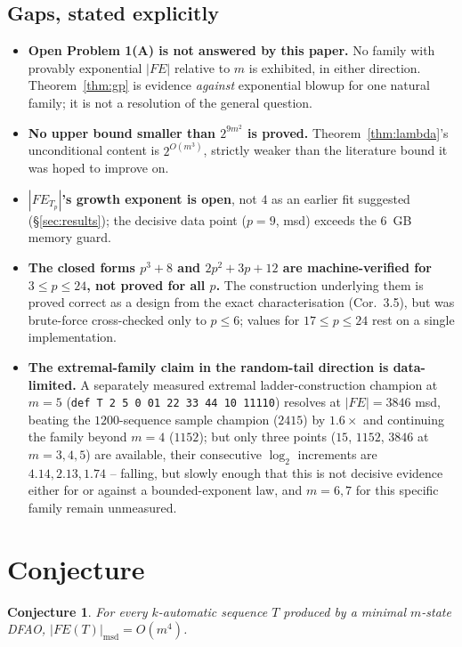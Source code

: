 \documentclass[11pt]{article}
\newtheorem{conjecture}[theorem]{Conjecture}
\begin{document}
\subsection{Gaps, stated explicitly}

\begin{itemize}
\item \textbf{Open Problem 1(A) is not answered by this paper.} No family with
provably exponential $|FE|$ relative to $m$ is exhibited, in either direction. Theorem~\ref{thm:gp}
is evidence \emph{against} exponential blowup for one natural family; it is not a
resolution of the general question.
\item \textbf{No upper bound smaller than $2^{9m^2}$ is proved.} Theorem~\ref{thm:lambda}'s
unconditional content is $2^{O(m^3)}$, strictly weaker than the literature bound it was
hoped to improve on.
\item \textbf{$|FE_{T_p}|$'s growth exponent is open}, not $4$ as an earlier fit
suggested (\S\ref{sec:results}); the decisive data point ($p=9$, msd) exceeds the $6$~GB
memory guard.
\item \textbf{The closed forms $p^3+8$ and $2p^2+3p+12$ are machine-verified for
$3\le p\le24$, not proved for all $p$.} The construction underlying them is proved
correct as a design from the exact characterisation (Cor.\ 3.5), but was brute-force
cross-checked only to $p\le6$; values for $17\le p\le24$ rest on a single implementation.
\item \textbf{The extremal-family claim in the random-tail direction is data-limited.}
A separately measured extremal ladder-construction champion at $m=5$
(\texttt{def T 2 5 0 01 22 33 44 10 11110}) resolves at $|FE|=3846$ msd, beating the
$1200$-sequence sample champion ($2415$) by $1.6\times$ and continuing the family beyond
$m=4$ ($1152$); but only three points ($15$, $1152$, $3846$ at $m=3,4,5$) are available,
their consecutive $\log_2$ increments are $4.14, 2.13, 1.74$ -- falling, but slowly enough
that this is not decisive evidence either for or against a bounded-exponent law, and
$m=6,7$ for this specific family remain unmeasured.
\end{itemize}

\section{Conjecture}
\label{sec:conjecture}

\begin{conjecture}
For every $k$-automatic sequence $T$ produced by a minimal $m$-state DFAO,
$|FE(T)|_{\mathrm{msd}} = O(m^4)$.
\end{conjecture}
\end{document}
